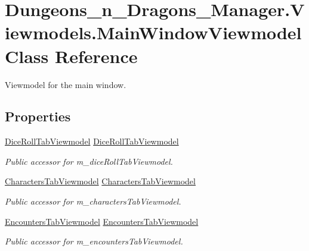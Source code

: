 \hypertarget{class_dungeons__n___dragons___manager_1_1_viewmodels_1_1_main_window_viewmodel}{}\section{Dungeons\+\_\+n\+\_\+\+Dragons\+\_\+\+Manager.\+Viewmodels.\+Main\+Window\+Viewmodel Class Reference}
\label{class_dungeons__n___dragons___manager_1_1_viewmodels_1_1_main_window_viewmodel}


Viewmodel for the main window.  


\subsection*{Properties}
\begin{DoxyCompactItemize}
\item 
\mbox{\hyperlink{class_dungeons__n___dragons___manager_1_1_viewmodels_1_1_dice_roll_tab_viewmodel}{Dice\+Roll\+Tab\+Viewmodel}} \mbox{\hyperlink{class_dungeons__n___dragons___manager_1_1_viewmodels_1_1_main_window_viewmodel_a23e3ceab2a5569d57db0493f6f2be9dc}{Dice\+Roll\+Tab\+Viewmodel}}
\begin{DoxyCompactList}\small\item\em Public accessor for m\+\_\+dice\+Roll\+Tab\+Viewmodel. \end{DoxyCompactList}\item 
\mbox{\hyperlink{class_dungeons__n___dragons___manager_1_1_viewmodels_1_1_characters_tab_viewmodel}{Characters\+Tab\+Viewmodel}} \mbox{\hyperlink{class_dungeons__n___dragons___manager_1_1_viewmodels_1_1_main_window_viewmodel_a189af694037410b1750f9d6406139421}{Characters\+Tab\+Viewmodel}}
\begin{DoxyCompactList}\small\item\em Public accessor for m\+\_\+characters\+Tab\+Viewmodel. \end{DoxyCompactList}\item 
\mbox{\hyperlink{class_dungeons__n___dragons___manager_1_1_viewmodels_1_1_encounters_tab_viewmodel}{Encounters\+Tab\+Viewmodel}} \mbox{\hyperlink{class_dungeons__n___dragons___manager_1_1_viewmodels_1_1_main_window_viewmodel_ad45b420b4188c0308f9c338ac4123cf9}{Encounters\+Tab\+Viewmodel}}
\begin{DoxyCompactList}\small\item\em Public accessor for m\+\_\+encounters\+Tab\+Viewmodel. \end{DoxyCompactList}\end{DoxyCompactItemize}
